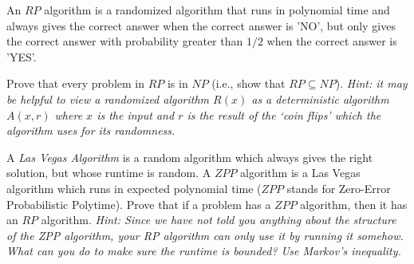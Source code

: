 \documentclass{article}
\begin{document}
An $RP$ algorithm is a randomized algorithm that runs in polynomial time and always gives the correct answer when the correct answer is 'NO', but only gives the correct answer with probability greater than $1/2$ when the correct answer is 'YES'. 

\begin{subparts}

\subpart Prove that every problem in $RP$ is in $NP$ (i.e., show that $RP \subseteq NP$). \textit{Hint: it may be helpful to view a randomized algorithm $R(x)$ as a deterministic algorithm $A(x, r)$ where $x$ is the input and $r$ is the result of the `coin flips' which the algorithm uses for its randomness.}

\subpart A \emph{Las Vegas Algorithm} is a random algorithm which always gives the right solution, but whose runtime is random. 
A $ZPP$ algorithm is a Las Vegas algorithm which runs in expected polynomial time ($ZPP$ stands for Zero-Error Probabilistic Polytime).
Prove that if a problem has a $ZPP$ algorithm, then it has an $RP$ algorithm. \textit{Hint: Since we have not told you anything about the structure of the ZPP algorithm, your RP algorithm can only use it by running it somehow. What can you do to make sure the runtime is bounded? Use Markov's inequality.}

\end{subparts}
\end{document}

